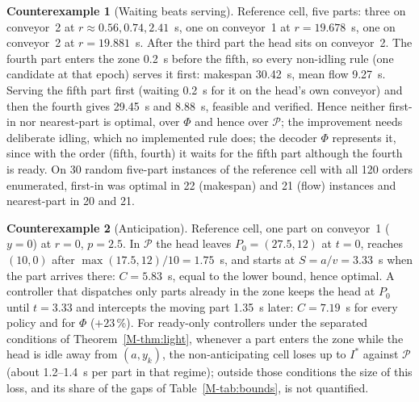 \documentclass[11pt,a4paper]{article}
\theoremstyle{plain}
\theoremstyle{definition}
\newtheorem{counterexample}{Counterexample}
\theoremstyle{remark}
\newcommand{\Pb}{\mathcal{P}}
\begin{document}
\begin{counterexample}[Waiting beats serving]\label{cex:wait}
Reference cell, five parts: three on conveyor~2 at $r\approx0.56,0.74,2.41$~s, one on
conveyor~1 at $r=19.678$~s, one on conveyor~2 at $r=19.881$~s. After the third part the
head sits on conveyor~2. The fourth part enters the zone 0.2~s before the fifth, so every
non-idling rule (one candidate at that epoch) serves it first: makespan 30.42~s, mean flow
9.27~s. Serving the fifth part first (waiting 0.2~s for it on the head's own conveyor) and
then the fourth gives 29.45~s and 8.88~s, feasible and verified. Hence neither first-in nor
nearest-part is optimal, over $\Phi$ and hence over $\Pb$; the improvement needs
deliberate idling, which no implemented rule does; the decoder $\Phi$ represents it,
since with the order (fifth, fourth) it waits for the fifth part although the fourth is
ready. On 30 random five-part instances of
the reference cell with all 120 orders enumerated, first-in was optimal in 22 (makespan)
and 21 (flow) instances and nearest-part in 20 and 21.
\end{counterexample}

\begin{counterexample}[Anticipation]\label{cex:anticipation}
Reference cell, one part on conveyor~1 ($y=0$) at $r=0$, $p=2.5$. In $\Pb$ the head leaves
$P_0=(27.5,12)$ at $t=0$, reaches $(10,0)$ after $\max(17.5,12)/10=1.75$~s, and starts at
$S=a/v=3.33$~s when the part arrives there: $C=5.83$~s, equal to the lower bound, hence
optimal. A controller that dispatches only parts already in the zone keeps the head at
$P_0$ until $t=3.33$ and intercepts the moving part 1.35~s later: $C=7.19$~s for every
policy and for $\Phi$ ($+23$\,\%). For ready-only controllers under the separated
conditions of Theorem~\ref{M-thm:light}, whenever a part enters the zone while the head is
idle away from $(a,y_k)$, the non-anticipating cell loses up to $I^\ast$ against $\Pb$
(about 1.2--1.4~s per part in that regime); outside those conditions the size of this
loss, and its share of the gaps of Table~\ref{M-tab:bounds}, is not quantified.
\end{counterexample}
\end{document}
